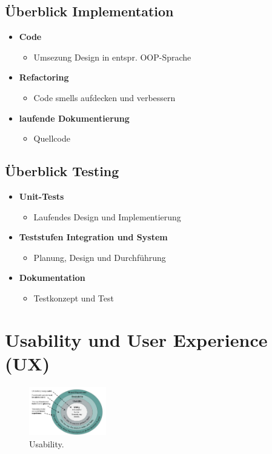 \documentclass{article}
\begin{document}
\subsection{Überblick Implementation}
\begin{itemize}
	\item \textbf{Code}
	\begin{itemize}
		\item Umsezung Design in entspr. OOP-Sprache
	\end{itemize}
	\item \textbf{Refactoring}
	\begin{itemize}
		\item Code smells aufdecken und verbessern
	\end{itemize}
	\item \textbf{laufende Dokumentierung}
	\begin{itemize}
		\item Quellcode
	\end{itemize}
\end{itemize}

\subsection{Überblick Testing}
\begin{itemize}
	\item \textbf{Unit-Tests}
	\begin{itemize}
		\item Laufendes Design und Implementierung
	\end{itemize}
	\item \textbf{Teststufen Integration und System}
	\begin{itemize}
		\item Planung, Design und Durchführung
	\end{itemize}
	\item \textbf{Dokumentation}
	\begin{itemize}
		\item Testkonzept und Test
	\end{itemize}
\end{itemize}


\section{Usability und User Experience (UX)}

\begin{figure}[H]
\centering
\includegraphics[width=0.3\textwidth]{Resources/Images/Usability.png}
\caption{\label{fig:Usability}Usability.}
\end{figure}
\end{document}
